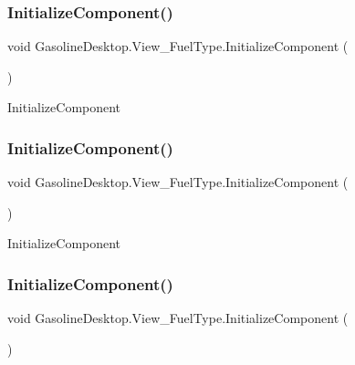 \subsubsection{\texorpdfstring{InitializeComponent()}{InitializeComponent()}\hspace{0.1cm}{\footnotesize\ttfamily [1/3]}}
{\footnotesize\ttfamily void Gasoline\+Desktop.\+View\+\_\+\+Fuel\+Type.\+Initialize\+Component (\begin{DoxyParamCaption}{ }\end{DoxyParamCaption})}



Initialize\+Component 

\mbox{\label{class_gasoline_desktop_1_1_view___fuel_type_aaf7734cbe0b913479e0cfd6596026939}} 
\subsubsection{\texorpdfstring{InitializeComponent()}{InitializeComponent()}\hspace{0.1cm}{\footnotesize\ttfamily [2/3]}}
{\footnotesize\ttfamily void Gasoline\+Desktop.\+View\+\_\+\+Fuel\+Type.\+Initialize\+Component (\begin{DoxyParamCaption}{ }\end{DoxyParamCaption})}



Initialize\+Component 

\mbox{\label{class_gasoline_desktop_1_1_view___fuel_type_aaf7734cbe0b913479e0cfd6596026939}} 
\subsubsection{\texorpdfstring{InitializeComponent()}{InitializeComponent()}\hspace{0.1cm}{\footnotesize\ttfamily [3/3]}}
{\footnotesize\ttfamily void Gasoline\+Desktop.\+View\+\_\+\+Fuel\+Type.\+Initialize\+Component (\begin{DoxyParamCaption}{ }\end{DoxyParamCaption})}



